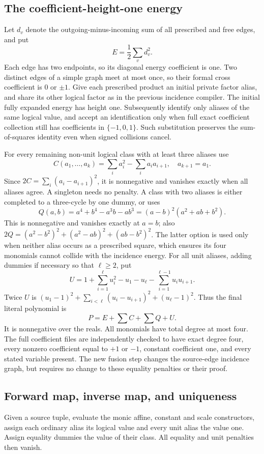 \subsection{The coefficient-height-one energy}
Let $d_v$ denote the outgoing-minus-incoming sum of all prescribed and
free edges, and put
\[
 E=\frac12\sum_vd_v^2.
\]
Each edge has two endpoints, so its diagonal energy coefficient is one.
Two distinct edges of a simple graph meet at most once, so their formal
cross coefficient is $0$ or $\pm1$. Give each prescribed product an
initial private factor alias, and share its other logical factor as in the
previous incidence compiler. The initial fully expanded energy has height
one. Subsequently identify only aliases of the same logical value, and
accept an identification only when full exact coefficient collection
still has coefficients in $\{-1,0,1\}$. Such substitution preserves the
sum-of-squares identity even when signed collisions cancel.

For every remaining non-unit logical class with at least three aliases use
\[
 C(a_1,\ldots,a_k)=\sum_i a_i^2-\sum_i a_i a_{i+1},\quad a_{k+1}=a_1.
\]
Since $2C=\sum_i(a_i-a_{i+1})^2$, it is nonnegative and vanishes exactly
when all aliases agree. A singleton needs no penalty. A class with two
aliases is either completed to a three-cycle by one dummy, or uses
\[
 Q(a,b)=a^4+b^4-a^3b-ab^3=(a-b)^2(a^2+ab+b^2).
\]
This is nonnegative and vanishes exactly at $a=b$; also
$2Q=(a^2-b^2)^2+(a^2-ab)^2+(ab-b^2)^2$. The latter option is used only
when neither alias occurs as a prescribed square, which ensures its four
monomials cannot collide with the incidence energy. For all unit aliases,
adding dummies if necessary so that $\ell\ge2$, put
\[
 U=1+\sum_{i=1}^{\ell}u_i^2-u_1-u_\ell-
       \sum_{i=1}^{\ell-1}u_iu_{i+1}.
\]
Twice $U$ is $(u_1-1)^2+\sum_{i<\ell}(u_i-u_{i+1})^2+(u_\ell-1)^2$.
Thus the final literal polynomial is
\begin{equation}\label{eq:networkenergy}
 \boxed{P=E+\sum C+\sum Q+U.}
\end{equation}
It is nonnegative over the reals. All monomials have total degree at most
four. The full coefficient files are independently checked to have exact
degree four, every nonzero coefficient equal to $+1$ or $-1$, constant
coefficient one, and every stated variable present. The new fusion step
changes the source-edge incidence graph, but requires no change to these
equality penalties or their proof.

\subsection{Forward map, inverse map, and uniqueness}
Given a source tuple, evaluate the monic affine, constant and scale
constructors, assign each ordinary alias its logical value and every unit
alias the value one. Assign equality dummies the value of their class.
All equality and unit penalties then vanish.

